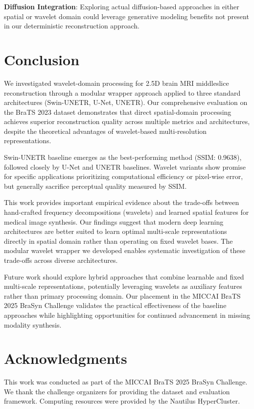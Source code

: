 \documentclass[conference]{IEEEtran}
\begin{document}
\textbf{Diffusion Integration}: Exploring actual diffusion-based approaches in either spatial or wavelet domain could leverage generative modeling benefits not present in our deterministic reconstruction approach.

\section{Conclusion}

We investigated wavelet-domain processing for 2.5D brain MRI middleslice reconstruction through a modular wrapper approach applied to three standard architectures (Swin-UNETR, U-Net, UNETR). Our comprehensive evaluation on the BraTS 2023 dataset demonstrates that direct spatial-domain processing achieves superior reconstruction quality across multiple metrics and architectures, despite the theoretical advantages of wavelet-based multi-resolution representations.

Swin-UNETR baseline emerges as the best-performing method (SSIM: 0.9638), followed closely by U-Net and UNETR baselines. Wavelet variants show promise for specific applications prioritizing computational efficiency or pixel-wise error, but generally sacrifice perceptual quality measured by SSIM.

This work provides important empirical evidence about the trade-offs between hand-crafted frequency decompositions (wavelets) and learned spatial features for medical image synthesis. Our findings suggest that modern deep learning architectures are better suited to learn optimal multi-scale representations directly in spatial domain rather than operating on fixed wavelet bases. The modular wavelet wrapper we developed enables systematic investigation of these trade-offs across diverse architectures.

Future work should explore hybrid approaches that combine learnable and fixed multi-scale representations, potentially leveraging wavelets as auxiliary features rather than primary processing domain. Our placement in the MICCAI BraTS 2025 BraSyn Challenge validates the practical effectiveness of the baseline approaches while highlighting opportunities for continued advancement in missing modality synthesis.

\section*{Acknowledgments}

This work was conducted as part of the MICCAI BraTS 2025 BraSyn Challenge. We thank the challenge organizers for providing the dataset and evaluation framework. Computing resources were provided by the Nautilus HyperCluster.



\end{document}
